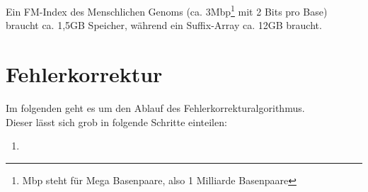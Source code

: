 Ein FM-Index des Menschlichen Genoms (ca. 3Mbp\footnote{Mbp steht für Mega Basenpaare, also 1 Milliarde Basenpaare} mit 2 Bits pro Base) braucht ca. 1,5GB Speicher, während ein Suffix-Array ca. 12GB braucht.

\section{Fehlerkorrektur}
\label{sec:methodik-fehlerkorrektur}

Im folgenden geht es um den Ablauf des Fehlerkorrekturalgorithmus. \\
Dieser lässt sich grob in folgende Schritte einteilen:

\begin{enumerate}
	\item
\end{enumerate}
